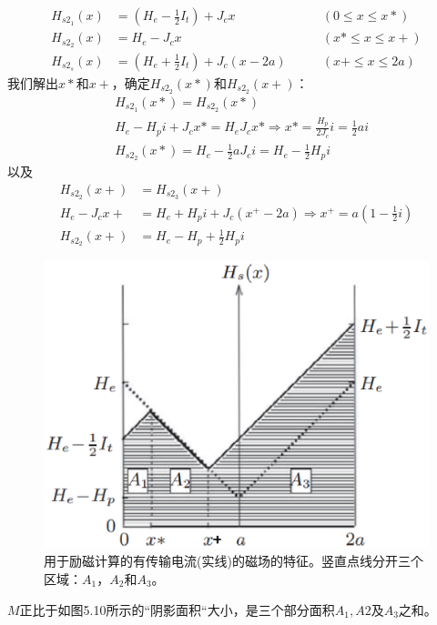 \begin{align*}
H_{s2_{1}}(x)&=(H_{e}-\frac{1}{2}I_{t})+J_{c}x\qquad&(0\leq x\leq x*)\\
H_{s2_{2}}(x)&=H_{e}-J_{c}x\qquad&(x*\leq x\leq x+)\\
H_{s2_{s}}(x)&=(H_{e}+\frac{1}{2}I_{t})+J_{c}(x-2a)\qquad&(x+\leq x\leq2a)
\end{align*}
我们解出$x*$和$x+$，确定$H_{s2_2}(x*)$和$H_{s2_2}(x+)$：
\begin{align*}
&H_{{s}2_{1}}(x*)=H_{s2_{2}}(x*)\\
&H_{e}-H_{p}i+J_{c}x*=H_{e}J_{c}x*\Rightarrow x*=\frac{H_{p}}{2J_{c}}i=\frac{1}{2}ai\\
&H_{s2_{2}}(x*)=H_{e}-\frac{1}{2}aJ_{c}i=H_{e}-\frac{1}{2}H_{p}i
\end{align*}
以及
\begin{align*}
H_{s2_{2}}(x+)&=H_{s2_{3}}(x+)\\
H_{e}-J_{c}x+&=H_{e}+H_{p}i+J_{c}(x^{+}-2a)\Rightarrow x^{+}=a(1-\frac{1}{2}i)\\
H_{s2_{2}}(x+)&=H_{e}-H_{p}+\frac{1}{2}H_{p}i
\end{align*}

\begin{figure}[htbp]
	\centering
	\includegraphics[scale=0.6]{chpt5/figs/fig5.10.eps}
	\caption{用于励磁计算的有传输电流(实线)的磁场的特征。竖直点线分开三个区域：$A_1， A_2$和$A_3$。}
\end{figure}

$M$正比于如图5.10所示的``阴影面积``大小，是三个部分面积$A_1, A2$及$A_3$之和。

